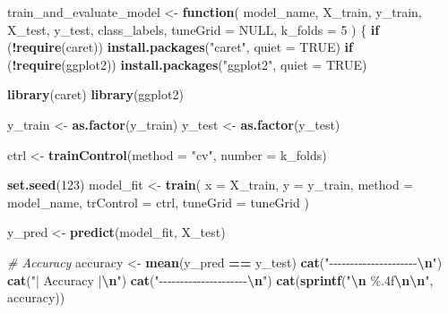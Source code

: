\documentclass[
]{article}
\newenvironment{Shaded}{\begin{snugshade}}{\end{snugshade}}
\newcommand{\AttributeTok}[1]{\textcolor[rgb]{0.13,0.29,0.53}{#1}}
\newcommand{\CommentTok}[1]{\textcolor[rgb]{0.56,0.35,0.01}{\textit{#1}}}
\newcommand{\ConstantTok}[1]{\textcolor[rgb]{0.56,0.35,0.01}{#1}}
\newcommand{\ControlFlowTok}[1]{\textcolor[rgb]{0.13,0.29,0.53}{\textbf{#1}}}
\newcommand{\DecValTok}[1]{\textcolor[rgb]{0.00,0.00,0.81}{#1}}
\newcommand{\FunctionTok}[1]{\textcolor[rgb]{0.13,0.29,0.53}{\textbf{#1}}}
\newcommand{\NormalTok}[1]{#1}
\newcommand{\OtherTok}[1]{\textcolor[rgb]{0.56,0.35,0.01}{#1}}
\newcommand{\SpecialCharTok}[1]{\textcolor[rgb]{0.81,0.36,0.00}{\textbf{#1}}}
\newcommand{\StringTok}[1]{\textcolor[rgb]{0.31,0.60,0.02}{#1}}
\begin{document}
\begin{Shaded}
\begin{Highlighting}[]
\NormalTok{train\_and\_evaluate\_model }\OtherTok{\textless{}{-}} \ControlFlowTok{function}\NormalTok{(}
\NormalTok{  model\_name,}
\NormalTok{  X\_train, y\_train, X\_test, y\_test,}
\NormalTok{  class\_labels,}
  \AttributeTok{tuneGrid =} \ConstantTok{NULL}\NormalTok{,}
  \AttributeTok{k\_folds =} \DecValTok{5}
\NormalTok{) \{}
  \ControlFlowTok{if}\NormalTok{ (}\SpecialCharTok{!}\FunctionTok{require}\NormalTok{(caret)) }\FunctionTok{install.packages}\NormalTok{(}\StringTok{"caret"}\NormalTok{, }\AttributeTok{quiet =} \ConstantTok{TRUE}\NormalTok{)}
  \ControlFlowTok{if}\NormalTok{ (}\SpecialCharTok{!}\FunctionTok{require}\NormalTok{(ggplot2)) }\FunctionTok{install.packages}\NormalTok{(}\StringTok{"ggplot2"}\NormalTok{, }\AttributeTok{quiet =} \ConstantTok{TRUE}\NormalTok{)}

  \FunctionTok{library}\NormalTok{(caret)}
  \FunctionTok{library}\NormalTok{(ggplot2)}
  
\NormalTok{  y\_train }\OtherTok{\textless{}{-}} \FunctionTok{as.factor}\NormalTok{(y\_train)}
\NormalTok{  y\_test }\OtherTok{\textless{}{-}} \FunctionTok{as.factor}\NormalTok{(y\_test)}
  
\NormalTok{  ctrl }\OtherTok{\textless{}{-}} \FunctionTok{trainControl}\NormalTok{(}\AttributeTok{method =} \StringTok{"cv"}\NormalTok{, }\AttributeTok{number =}\NormalTok{ k\_folds)}
  
  \FunctionTok{set.seed}\NormalTok{(}\DecValTok{123}\NormalTok{)}
\NormalTok{  model\_fit }\OtherTok{\textless{}{-}} \FunctionTok{train}\NormalTok{(}
    \AttributeTok{x =}\NormalTok{ X\_train,}
    \AttributeTok{y =}\NormalTok{ y\_train,}
    \AttributeTok{method =}\NormalTok{ model\_name,}
    \AttributeTok{trControl =}\NormalTok{ ctrl,}
    \AttributeTok{tuneGrid =}\NormalTok{ tuneGrid}
\NormalTok{  )}
  
\NormalTok{  y\_pred }\OtherTok{\textless{}{-}} \FunctionTok{predict}\NormalTok{(model\_fit, X\_test)}
  
  \CommentTok{\# Accuracy}
\NormalTok{  accuracy }\OtherTok{\textless{}{-}} \FunctionTok{mean}\NormalTok{(y\_pred }\SpecialCharTok{==}\NormalTok{ y\_test)}
  \FunctionTok{cat}\NormalTok{(}\StringTok{"{-}{-}{-}{-}{-}{-}{-}{-}{-}{-}{-}{-}{-}{-}{-}{-}{-}{-}{-}{-}{-}}\SpecialCharTok{\textbackslash{}n}\StringTok{"}\NormalTok{)}
  \FunctionTok{cat}\NormalTok{(}\StringTok{"|      Accuracy      |}\SpecialCharTok{\textbackslash{}n}\StringTok{"}\NormalTok{)}
  \FunctionTok{cat}\NormalTok{(}\StringTok{"{-}{-}{-}{-}{-}{-}{-}{-}{-}{-}{-}{-}{-}{-}{-}{-}{-}{-}{-}{-}{-}}\SpecialCharTok{\textbackslash{}n}\StringTok{"}\NormalTok{)}
  \FunctionTok{cat}\NormalTok{(}\FunctionTok{sprintf}\NormalTok{(}\StringTok{"}\SpecialCharTok{\textbackslash{}n}\StringTok{    \%.4f}\SpecialCharTok{\textbackslash{}n\textbackslash{}n}\StringTok{"}\NormalTok{, accuracy))}
  

\end{Highlighting}
\end{Shaded}
\end{document}
